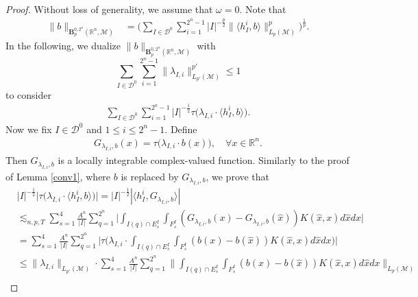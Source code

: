 \documentclass[oneside,english,a4wide]{amsart}
\numberwithin{equation}{section}
\numberwithin{figure}{section}
\theoremstyle{plain}
\theoremstyle{plain}
\theoremstyle{definition}
\theoremstyle{plain}
\theoremstyle{remark}
\theoremstyle{definition}
\theoremstyle{remark}
\theoremstyle{definition}
\newcommand{\8}{\infty}
\begin{document}
\begin{proof}
Without loss of generality, we assume that $\omega=0$. Note that
	\begin{equation*}
		\begin{aligned}
			\|b\|_{\pmb{B}_p^{0,2^n}(\mathbb{R}^n,\mathcal{M})}{}&=\bigg(\sum_{I\in\mathcal{D}^0}\sum_{i=1}^{2^n-1}|I|^{-\frac{p}{2}}\|\langle h_I^i,b\rangle\|^p_{L_p(\mathcal{M})}\bigg)^{\frac{1}{p}}.
		\end{aligned}
	\end{equation*}
    In the following, we dualize $\|b\|_{\pmb{B}_p^{0,2^n}(\mathbb{R}^n,\mathcal{M})}$ with
    \begin{equation}\label{lambdaIi1}
        \sum_{I\in\mathcal{D}^0}\sum_{i=1}^{2^n-1}\|\lambda_{I,i}\|^{p'}_{L_{p'}(\mathcal{M})}\le 1
    \end{equation}
     to consider
    \begin{equation*}
    	\begin{aligned}
    		\sum_{I\in\mathcal{D}^0}\sum_{i=1}^{2^n-1} |I|^{-\frac{1}{2}}\tau\big(\lambda_{I,i}\cdot\langle h_I^i,b\rangle \big).
    	\end{aligned}
    \end{equation*}
	Now we fix $I\in \mathcal{D}^0$ and $1\le i\le 2^n-1$. 
	Define 
	\begin{equation*}
		\begin{aligned}
			G_{\lambda_{I,i},b}(x)=\tau\big(\lambda_{I,i}\cdot b(x)\big),\quad \forall x\in \mathbb{R}^n.
		\end{aligned}
	\end{equation*}
	Then $G_{\lambda_{I,i},b}$ is a locally integrable complex-valued function. Similarly to the proof of Lemma \ref{conv1}, where $b$ is replaced by $G_{\lambda_{I,i},b}$, we prove that
	\begin{equation*}
		\begin{aligned}
			{}&|I|^{-\frac{1}{2}}\big|\tau\big(\lambda_{I,i}\cdot\langle h_I^i,b\rangle \big)\big|
			= |I|^{-\frac{1}{2}}|\langle h_I^i,G_{\lambda_{I,i},b} \rangle|\\
			&\lesssim_{n,p,T}  \sum_{s=1}^4 \frac{A^n}{|I|}\sum_{q=1}^{2^n}\bigg|\int_{I(q)\cap E_s^I}\int_{F_s^I} (G_{\lambda_{I,i},b}(x)-G_{\lambda_{I,i},b}(\hat{x}))K(\hat{x},x)d\hat{x}dx\bigg|\\
			&=\sum_{s=1}^4 \frac{A^n}{|I|}\sum_{q=1}^{2^n}\bigg|\tau\biggl(\lambda_{I,i}\cdot \int_{I(q)\cap E_s^I}\int_{F_s^I} (b(x)-b(\hat{x}))K(\hat{x},x)d\hat{x}dx\biggr)\bigg|\\
			&\leq \|\lambda_{I,i}\|_{L_{p'}(\mathcal{M})}\cdot\sum_{s=1}^4 \frac{A^n}{|I|}\sum_{q=1}^{2^n}\bigg\| \int_{I(q)\cap E_s^I}\int_{F_s^I} (b(x)-b(\hat{x}))K(\hat{x},x)d\hat{x}dx\bigg\|_{L_p(\mathcal{M})}\\

\end{aligned}
\end{equation*}
\end{proof}
\end{document}
